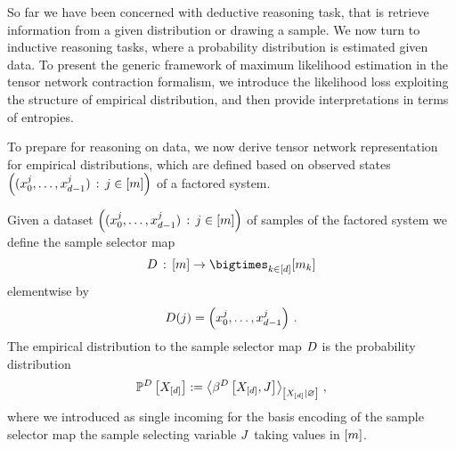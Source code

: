 
So far we have been concerned with deductive reasoning task, that is retrieve information from a given distribution or drawing a sample.
We now turn to inductive reasoning tasks, where a probability distribution is estimated given data.
To present the generic framework of maximum likelihood estimation in the tensor network contraction formalism, we introduce the likelihood loss exploiting the structure of empirical distribution, and then provide interpretations in terms of entropies.

\label{sec:empDistribution}

To prepare for reasoning on data, we now derive tensor network representation for empirical distributions, which are defined based on observed states $\left(({x_{0}^{j},\ldots,x_{d-1}^{j}})\,:\,j\in[m]\right)$ of a factored system.

\begin{definition}
    \label{def:dataMap}
    Given a dataset $\left(({x_{0}^{j},\ldots,x_{d-1}^{j}})\,:\,j\in[m]\right)$ of samples of the factored system we define the sample selector map
    \begin{align*}
        \datamap \defcols [\datanum] \rightarrow \facstates
    \end{align*}
    elementwise by
    \begin{align*}
        D(j) = \left({x_{0}^{j},\ldots,x_{d-1}^{j}}\right) \, .
    \end{align*}
    The empirical distribution to the sample selector map $D$ is the probability distribution
    \begin{align*}
        \empdistributionat{\shortcatvariables}
        \coloneqq \normalizationof{\bencodingofat{\datamap}{\shortcatvariables,\datvariable}}{\shortcatvariables} \, ,
    \end{align*}
    where we introduced as single incoming for the basis encoding of the sample selector map the sample selecting variable $J$ taking values in $[m]$.
\end{definition}

